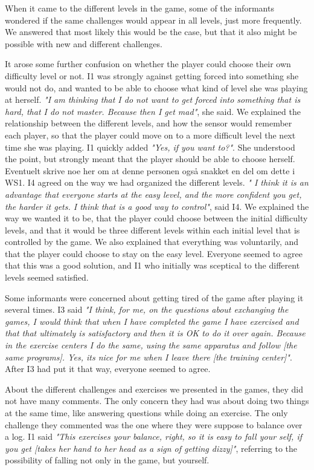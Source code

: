 When it came to the different levels in the game, some of the informants wondered if the same challenges would appear in all levels, just more frequently. We answered that most likely this would be the case, but that it also might be possible with new and different challenges. 

It arose some further confusion on whether the player could choose their own difficulty level or not. I1 was strongly against getting forced into something she would not do, and wanted to be able to choose what kind of level she was playing at herself. \emph{"I am thinking that I do not want to get forced into something that is hard, that I do not master. Because then I get mad"}, she said. We explained the relationship between the different levels, and how the sensor would remember each player, so that the player could move on to a more difficult level the next time she was playing. I1 quickly added \emph{"Yes, if you want to?"}.  She understood the point, but strongly meant that the player should be able to choose herself. Eventuelt skrive noe her om at denne personen også snakket en del om dette i WS1.
I4 agreed on the way we had organized the different levels. \emph{"
I think it is an advantage that everyone starts at the easy level, and the more confident you get, the harder it gets. I think that is a good way to control"}, said I4. We explained the way we wanted it to be, that the player could choose between the initial difficulty levels, and that it would be three different levels within each initial level that is controlled by the game. We also explained that everything was voluntarily, and that the player could choose to stay on the easy level. Everyone seemed to agree that this was a good solution, and I1 who initially was sceptical to the different levels seemed satisfied. 

Some informants were concerned about getting tired of the game after playing it several times. I3 said \emph{"I think, for me, on the questions about exchanging the games, I would think that when I have completed the game I have exercised and that that ultimately is satisfactory and then it is OK to do it over again. Because in the exercise centers I do the same, using the same apparatus and follow [the same programs]. Yes, its nice for me when I leave there [the training center]"}. After I3 had put it that way, everyone seemed to agree. 

About the different challenges and exercises we presented in the games, they did not have many comments. The only concern they had was about doing two things at the same time, like answering questions while doing an exercise. The only challenge they commented was the one where they were suppose to balance over a log. I1 said \emph{"This exercises your balance, right, so it is easy to fall your self, if you get [takes her hand to her head as a sign of getting dizzy]"}, referring to the possibility of falling not only in the game, but yourself. 

